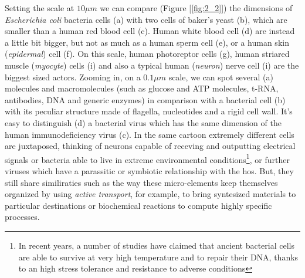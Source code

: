 \documentclass[../main/main.tex]{subfiles}
\begin{document}
Setting the scale at $10\mu m$ we can compare (Figure [\ref{fig:2_2}]) the dimensions of \emph{Escherichia coli} bacteria cells (a) with two cells of baker's yeast (b), which are smaller than a human red blood cell (c). Human white blood cell (d) are instead a little bit bigger, but not as much as a human sperm cell (e), or a human skin (\emph{epidermal}) cell (f). On this scale, human photoreptor cells (g), human striared muscle (\emph{myocyte}) cells (i) and also a typical human (\emph{neuron}) nerve cell (i) are the biggest sized actors. Zooming in, on a $0.1\mu m$ scale, we can spot several (a) molecules and macromolecules (such as glucose and ATP molecules, t-RNA, antibodies, DNA and generic enzymes) in comparison with a bacterial cell (b) with its peculiar structure made of flagella, nucleotides and a rigid cell wall. It's easy to distinguish (d) a bacterial virus which has the same dimension of the human immunodeficiency virus (c). 
In the same cartoon extremely different cells are juxtaposed, thinking of neurons capable of receving and outputting electrical signals or bacteria able to live in extreme environmental conditions\footnote{In recent years, a number of studies have claimed that ancient bacterial cells are able to survive at very high temperature and to repair their DNA, thanks to an high stress tolerance and resistance to adverse conditions\cite{bacteria}}, or further viruses which have a parassitic or symbiotic relationship with the hos. But, they still share similiraties such as the way these micro-elements keep themselves organized by using \emph{active transport}, for example, to bring syntesized materials to particular destinations or biochemical reactions to compute highly specific processes.   
\end{document}
